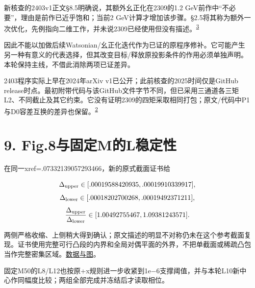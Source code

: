 \documentclass[
  10pt,
  a4paper,
]{article}
\begin{document}
新核查的2403v1正文§8.5明确说，其额外幺正化在2309的1.2
GeV前作中``不必要''，理由是前作已近乎饱和；当前2
GeV计算才增加该步骤。§2.5将其称为额外一次优化，先例指向二维工作，并未说2309已经使用但没有描述。\textsuperscript{\hyperref[source-iteration]{3}}

因此不能以加做后续Watsonian/幺正化迭代作为已证的原程序修补。它可能产生另一种有意义的代表选择，但其改变目标/释放原投影条件的作用必须单独声明。本轮保持主线，不借此消除两项已证差异。

2403程序实际上早在2024年arXiv v1已公开；此前核查的2025时间仅是GitHub
release时点。最初附带代码与该GitHub文件字节不同，但已采用三通道各三矩L2、不同截止及其它约束。它没有证明2309的四矩采取相同打包；原文/代码中P1与D0容差互换的差异也保留。\textsuperscript{\hyperref[source-norm]{2}}

\section{9.
Fig.8与固定M的L稳定性}\label{fig.8ux4e0eux56faux5b9amux7684lux7a33ux5b9aux6027}

在同一xref=.07332139057293466，新的原式截面证书给

\[\Delta_{\rm upper}\in[.00019588420935,.00019910339917],\]
\[\Delta_{\rm lower}\in[.00018202700268,.00019492371211],\]
\[\frac{\Delta_{\rm upper}}{\Delta_{\rm lower}}
\in[1.00492755467,1.09381243571].\]

两侧严格收缩、上侧稍大得到确认；原文描述的明显不对称仍未在这个参考截面复现。证书使用完整可行凸段的内界和全局对偶平面的外界，不把单截面或稀疏凸包当作完整密集区域。\href{../refined_regions/regions.json}{数据与图}。

固定M50的L8/L12也按原+x规则进一步收紧到1e−6支撑阈值，并与本轮L10新中心作同幅度比较；两组全部完成并冻结后才读取相位。
\end{document}
